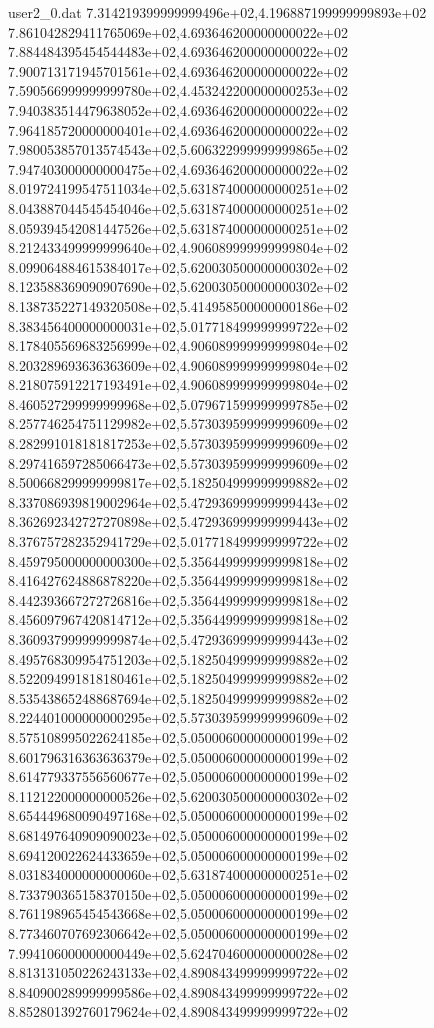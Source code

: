 \begin{filecontents}{user2_0.dat}
7.314219399999999496e+02,4.196887199999999893e+02
7.861042829411765069e+02,4.693646200000000022e+02
7.884484395454544483e+02,4.693646200000000022e+02
7.900713171945701561e+02,4.693646200000000022e+02
7.590566999999999780e+02,4.453242200000000253e+02
7.940383514479638052e+02,4.693646200000000022e+02
7.964185720000000401e+02,4.693646200000000022e+02
7.980053857013574543e+02,5.606322999999999865e+02
7.947403000000000475e+02,4.693646200000000022e+02
8.019724199547511034e+02,5.631874000000000251e+02
8.043887044545454046e+02,5.631874000000000251e+02
8.059394542081447526e+02,5.631874000000000251e+02
8.212433499999999640e+02,4.906089999999999804e+02
8.099064884615384017e+02,5.620030500000000302e+02
8.123588369090907690e+02,5.620030500000000302e+02
8.138735227149320508e+02,5.414958500000000186e+02
8.383456400000000031e+02,5.017718499999999722e+02
8.178405569683256999e+02,4.906089999999999804e+02
8.203289693636363609e+02,4.906089999999999804e+02
8.218075912217193491e+02,4.906089999999999804e+02
8.460527299999999968e+02,5.079671599999999785e+02
8.257746254751129982e+02,5.573039599999999609e+02
8.282991018181817253e+02,5.573039599999999609e+02
8.297416597285066473e+02,5.573039599999999609e+02
8.500668299999999817e+02,5.182504999999999882e+02
8.337086939819002964e+02,5.472936999999999443e+02
8.362692342727270898e+02,5.472936999999999443e+02
8.376757282352941729e+02,5.017718499999999722e+02
8.459795000000000300e+02,5.356449999999999818e+02
8.416427624886878220e+02,5.356449999999999818e+02
8.442393667272726816e+02,5.356449999999999818e+02
8.456097967420814712e+02,5.356449999999999818e+02
8.360937999999999874e+02,5.472936999999999443e+02
8.495768309954751203e+02,5.182504999999999882e+02
8.522094991818180461e+02,5.182504999999999882e+02
8.535438652488687694e+02,5.182504999999999882e+02
8.224401000000000295e+02,5.573039599999999609e+02
8.575108995022624185e+02,5.050006000000000199e+02
8.601796316363636379e+02,5.050006000000000199e+02
8.614779337556560677e+02,5.050006000000000199e+02
8.112122000000000526e+02,5.620030500000000302e+02
8.654449680090497168e+02,5.050006000000000199e+02
8.681497640909090023e+02,5.050006000000000199e+02
8.694120022624433659e+02,5.050006000000000199e+02
8.031834000000000060e+02,5.631874000000000251e+02
8.733790365158370150e+02,5.050006000000000199e+02
8.761198965454543668e+02,5.050006000000000199e+02
8.773460707692306642e+02,5.050006000000000199e+02
7.994106000000000449e+02,5.624704600000000028e+02
8.813131050226243133e+02,4.890843499999999722e+02
8.840900289999999586e+02,4.890843499999999722e+02
8.852801392760179624e+02,4.890843499999999722e+02

\end{filecontents}
